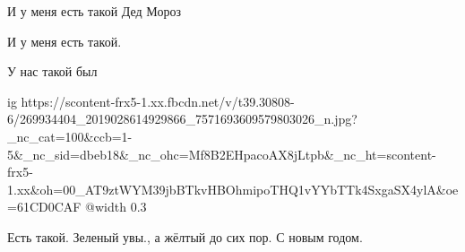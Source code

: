  
 
 
 
 

И у меня есть такой Дед Мороз

И у меня есть такой.

У нас такой был


\ifcmt
  ig https://scontent-frx5-1.xx.fbcdn.net/v/t39.30808-6/269934404_2019028614929866_7571693609579803026_n.jpg?_nc_cat=100&ccb=1-5&_nc_sid=dbeb18&_nc_ohc=Mf8B2EHpacoAX8jLtpb&_nc_ht=scontent-frx5-1.xx&oh=00_AT9ztWYM39jbBTkvHBOhmipoTHQ1vYYbTTk4SxgaSX4ylA&oe=61CD0CAF
  @width 0.3
\fi


Есть такой. Зеленый увы., а жёлтый до сих пор. С новым годом.

